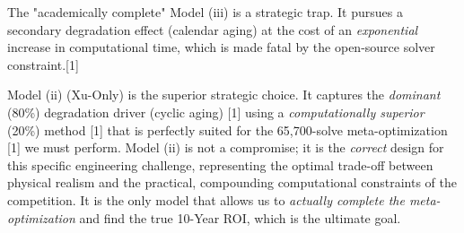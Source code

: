\documentclass[11pt, a4paper]{article}
\begin{document}
The "academically complete" Model (iii) is a strategic trap. It pursues a secondary degradation effect (calendar aging) at the cost of an \textit{exponential} increase in computational time, which is made fatal by the open-source solver constraint.[1]

Model (ii) (Xu-Only) is the superior strategic choice. It captures the \textit{dominant} (80\%) degradation driver (cyclic aging) [1] using a \textit{computationally superior} (20\%) method [1] that is perfectly suited for the 65,700-solve meta-optimization [1] we must perform. Model (ii) is not a compromise; it is the \textit{correct} design for this specific engineering challenge, representing the optimal trade-off between physical realism and the practical, compounding computational constraints of the competition. It is the only model that allows us to \textit{actually complete the meta-optimization} and find the true 10-Year ROI, which is the ultimate goal.
\end{document}
